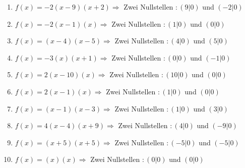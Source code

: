 \documentclass{article}%
\begin{document}
\begin{enumerate}[label=\alph*)]
\item%
\newline\vspace{0.5cm}$f(x)=-2(x-9)(x+2) \Rightarrow $ Zwei Nullstellen $: (9|0) $ und $ (-2|0) $%
\item%
\newline\vspace{0.5cm}$f(x)=-2(x-1)(x) \Rightarrow $ Zwei Nullstellen $: (1|0) $ und $ (0|0) $%
\item%
\newline\vspace{0.5cm}$f(x)=(x-4)(x-5) \Rightarrow $ Zwei Nullstellen $: (4|0) $ und $ (5|0) $%
\item%
\newline\vspace{0.5cm}$f(x)=-3(x)(x+1) \Rightarrow $ Zwei Nullstellen $: (0|0) $ und $ (-1|0) $%
\item%
\newline\vspace{0.5cm}$f(x)=2(x-10)(x) \Rightarrow $ Zwei Nullstellen $: (10|0) $ und $ (0|0) $%
\item%
\newline\vspace{0.5cm}$f(x)=2(x-1)(x) \Rightarrow $ Zwei Nullstellen $: (1|0) $ und $ (0|0) $%
\item%
\newline\vspace{0.5cm}$f(x)=(x-1)(x-3) \Rightarrow $ Zwei Nullstellen $: (1|0) $ und $ (3|0) $%
\item%
\newline\vspace{0.5cm}$f(x)=4(x-4)(x+9) \Rightarrow $ Zwei Nullstellen $: (4|0) $ und $ (-9|0) $%
\item%
\newline\vspace{0.5cm}$f(x)=(x+5)(x+5) \Rightarrow $ Zwei Nullstellen $: (-5|0) $ und $ (-5|0) $%
\item%
\newline\vspace{0.5cm}$f(x)=(x)(x) \Rightarrow $ Zwei Nullstellen $: (0|0) $ und $ (0|0) $%
\end{enumerate}

%
\end{document}
